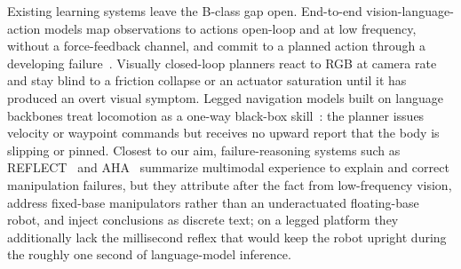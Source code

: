\documentclass[conference]{IEEEtran}
\begin{document}
Existing learning systems leave the B-class gap open. End-to-end
vision-language-action models map observations to actions open-loop and at low
frequency, without a force-feedback channel, and commit to a planned action
through a developing
failure~\cite{brohan2023rt2,kim2024openvla,octo2024,driess2023palme}. Visually
closed-loop planners react to RGB at camera rate~\cite{bu2024clover,zhi2024comerobot}
and stay blind to a friction collapse or an actuator saturation until it has
produced an overt visual symptom. Legged navigation models built on language
backbones treat locomotion as a one-way black-box
skill~\cite{cheng2024navila,mei2024quadrupedgpt,wu2024doggybot}: the planner
issues velocity or waypoint commands but receives no upward report that the body
is slipping or pinned. Closest to our aim, failure-reasoning systems such as
REFLECT~\cite{liu2023reflect} and AHA~\cite{duan2025aha} summarize multimodal
experience to explain and correct manipulation failures, but they attribute after
the fact from low-frequency vision, address fixed-base manipulators rather than an
underactuated floating-base robot, and inject conclusions as discrete text; on a
legged platform they additionally lack the millisecond reflex that would keep the
robot upright during the roughly one second of language-model inference.
\end{document}
